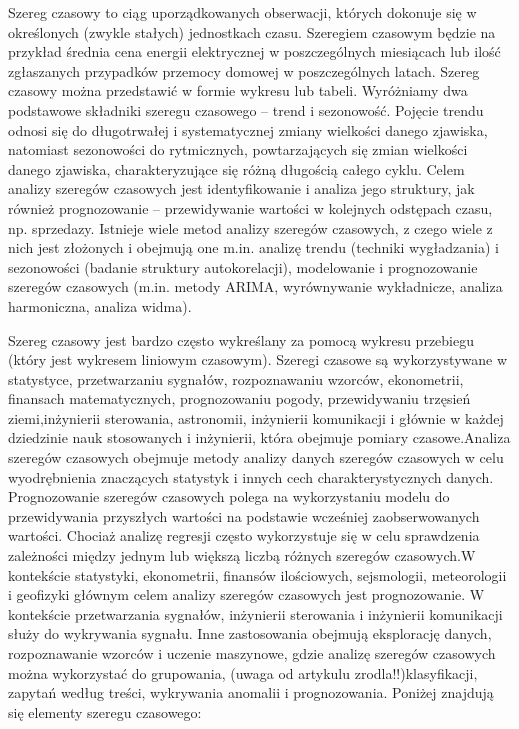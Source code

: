 Szereg czasowy to ciąg uporządkowanych obserwacji, których dokonuje się w określonych (zwykle stałych) jednostkach czasu. Szeregiem czasowym będzie na przykład średnia cena energii elektrycznej w poszczególnych miesiącach lub ilość zgłaszanych przypadków przemocy domowej w poszczególnych latach. Szereg czasowy można przedstawić w formie wykresu lub tabeli.
Wyróżniamy dwa podstawowe składniki szeregu czasowego – trend i sezonowość. Pojęcie trendu odnosi się do długotrwałej i systematycznej zmiany wielkości danego zjawiska, natomiast sezonowości do rytmicznych, powtarzających się zmian wielkości danego zjawiska, charakteryzujące się różną długością całego cyklu. 
Celem analizy szeregów czasowych jest identyfikowanie i analiza jego struktury, jak również prognozowanie – przewidywanie wartości w kolejnych odstępach czasu, np. sprzedazy. Istnieje wiele metod analizy szeregów czasowych, z czego wiele z nich jest złożonych i obejmują one m.in. analizę trendu (techniki wygładzania) i sezonowości (badanie struktury autokorelacji), modelowanie i prognozowanie szeregów czasowych (m.in. metody ARIMA, wyrównywanie wykładnicze, analiza harmoniczna, analiza widma).\cite{szereg2023}

Szereg czasowy jest bardzo często wykreślany za pomocą wykresu przebiegu (który jest wykresem liniowym czasowym). Szeregi czasowe są wykorzystywane w statystyce, przetwarzaniu sygnałów, rozpoznawaniu wzorców, ekonometrii, finansach matematycznych, prognozowaniu pogody, przewidywaniu trzęsień ziemi,inżynierii sterowania, astronomii, inżynierii komunikacji i głównie w każdej dziedzinie nauk stosowanych i inżynierii, która obejmuje pomiary czasowe.Analiza szeregów czasowych obejmuje metody analizy danych szeregów czasowych w celu wyodrębnienia znaczących statystyk i innych cech charakterystycznych danych. Prognozowanie szeregów czasowych polega na wykorzystaniu modelu do przewidywania przyszłych wartości na podstawie wcześniej zaobserwowanych wartości. Chociaż analizę regresji często wykorzystuje się w celu sprawdzenia zależności między jednym lub większą liczbą różnych szeregów czasowych.W kontekście statystyki, ekonometrii, finansów ilościowych, sejsmologii, meteorologii i geofizyki głównym celem analizy szeregów czasowych jest prognozowanie. W kontekście przetwarzania sygnałów, inżynierii sterowania i inżynierii komunikacji służy do wykrywania sygnału. Inne zastosowania obejmują eksplorację danych, rozpoznawanie wzorców i uczenie maszynowe, gdzie analizę szeregów czasowych można wykorzystać do grupowania, (uwaga od artykulu zrodla!!)klasyfikacji,  zapytań według treści,  wykrywania anomalii i prognozowania.\cite{series2023}
\newpage
Poniżej znajdują się elementy szeregu czasowego:

